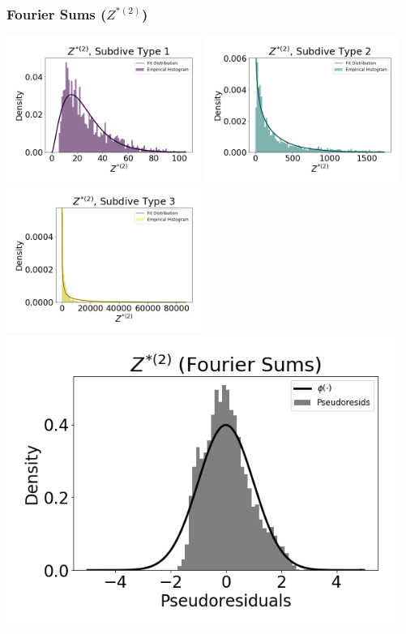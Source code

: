 \documentclass[12pt]{TD-CJS}
\begin{document}
\newpage
\subsubsection{Fourier Sums ($Z^{*(2)}$)}

\includegraphics[width=2.5in]{../Plots/HHMM_empirical_hist_ahat_0.png}
\includegraphics[width=2.5in]{../Plots/HHMM_empirical_hist_ahat_1.png}
\includegraphics[width=2.5in]{../Plots/HHMM_empirical_hist_ahat_2.png}
\includegraphics[width=5in]{../Plots/HHMM_psedoresids_ahat.png}
\end{document}

